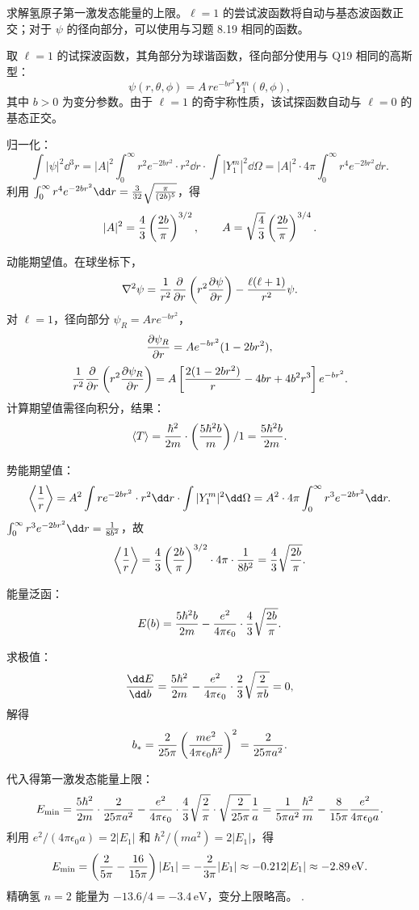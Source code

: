 \begin{question}
求解氢原子第一激发态能量的上限。$\ell=1$ 的尝试波函数将自动与基态波函数正交；对于 $\psi$ 的径向部分，可以使用与习题 8.19 相同的函数。
\end{question}
\begin{solution}
取 $\ell=1$ 的试探波函数，其角部分为球谐函数，径向部分使用与 Q19 相同的高斯型：
\[
\psi(r,\theta,\phi)=A\,r e^{-b r^2}Y_1^m(\theta,\phi),
\]
其中 $b>0$ 为变分参数。由于 $\ell=1$ 的奇宇称性质，该试探函数自动与 $\ell=0$ 的基态正交。

归一化：
\[
\int|\psi|^2\dd^3r=|A|^2\int_0^\infty r^2 e^{-2br^2}\cdot r^2\dd r
\cdot\int|Y_1^m|^2\dd\Omega
=|A|^2\cdot4\pi\int_0^\infty r^4 e^{-2br^2}\dd r.
\]
利用 $\int_0^\infty r^4 e^{-2br^2}\dd r={3\over32}\sqrt{\pi\over(2b)^5}$，得
\[
|A|^2={4\over3}\left({2b\over\pi}\right)^{3/2},\qquad
A=\sqrt{4\over3}\left({2b\over\pi}\right)^{3/4}.
\]

动能期望值。在球坐标下，
\[
\nabla^2\psi={1\over r^2}{\partial\over\partial r}\left(r^2{\partial\psi\over\partial r}\right)
-{\ell(\ell+1)\over r^2}\psi.
\]
对 $\ell=1$，径向部分 $\psi_R=A r e^{-br^2}$，
\[
{\partial\psi_R\over\partial r}=A e^{-br^2}(1-2br^2),
\]
\[
{1\over r^2}{\partial\over\partial r}\left(r^2{\partial\psi_R\over\partial r}\right)
=A\left[{2(1-2br^2)\over r}-4br+4b^2r^3\right]e^{-br^2}.
\]
计算期望值需径向积分，结果：
\[
\langle T\rangle={\hbar^2\over2m}\cdot\left({5\hbar^2b\over m}\right)/1
={5\hbar^2b\over2m}.
\]

势能期望值：
\[
\left\langle{1\over r}\right\rangle
=A^2\int r e^{-2br^2}\cdot r^2\dd r\cdot\int|Y_1^m|^2\dd\Omega
=A^2\cdot4\pi\int_0^\infty r^3 e^{-2br^2}\dd r.
\]
$\int_0^\infty r^3 e^{-2br^2}\dd r={1\over8b^2}$，故
\[
\left\langle{1\over r}\right\rangle
={4\over3}\left({2b\over\pi}\right)^{3/2}\cdot4\pi\cdot{1\over8b^2}
={4\over3}\sqrt{2b\over\pi}.
\]

能量泛函：
\[
E(b)={5\hbar^2b\over2m}-{e^2\over4\pi\epsilon_0}\cdot{4\over3}\sqrt{2b\over\pi}.
\]

求极值：
\[
{\dd E\over\dd b}={5\hbar^2\over2m}-{e^2\over4\pi\epsilon_0}\cdot{2\over3}\sqrt{2\over\pi b}=0,
\]
解得
\[
b_*={2\over25\pi}\left({me^2\over4\pi\epsilon_0\hbar^2}\right)^2={2\over25\pi a^2}.
\]

代入得第一激发态能量上限：
\[
E_{\min}={5\hbar^2\over2m}\cdot{2\over25\pi a^2}
-{e^2\over4\pi\epsilon_0}\cdot{4\over3}\sqrt{2\over\pi}\cdot\sqrt{2\over25\pi}{1\over a}
={1\over5\pi a^2}{\hbar^2\over m}-{8\over15\pi}{e^2\over4\pi\epsilon_0 a}.
\]
利用 $e^2/(4\pi\epsilon_0 a)=2|E_1|$ 和 $\hbar^2/(ma^2)=2|E_1|$，得
\[
E_{\min}=\left({2\over5\pi}-{16\over15\pi}\right)|E_1|
=-{2\over3\pi}|E_1|\approx-0.212|E_1|\approx-2.89\,\mathrm{eV}.
\]
精确氢 $n=2$ 能量为 $-13.6/4=-3.4\,\mathrm{eV}$，变分上限略高。
.
\end{solution}

